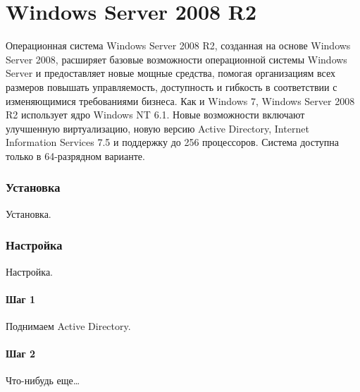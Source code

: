\part{Windows Server 2008 R2}
Операционная система Windows Server 2008 R2, созданная на основе Windows Server 2008, расширяет базовые возможности операционной системы Windows Server и предоставляет новые мощные средства, помогая организациям всех размеров повышать управляемость, доступность и гибкость в соответствии с изменяющимися требованиями бизнеса.
Как и Windows 7, Windows Server 2008 R2 использует ядро Windows NT 6.1.
Новые возможности включают улучшенную виртуализацию, новую версию Active Directory, Internet Information Services 7.5 и поддержку до 256 процессоров. Система доступна только в 64-разрядном варианте.

\section{Установка}
Установка.

\section{Настройка}
Настройка.

\subsection{Шаг 1}
Поднимаем Active Directory.

\subsection{Шаг 2}
Что-нибудь еще\ldots